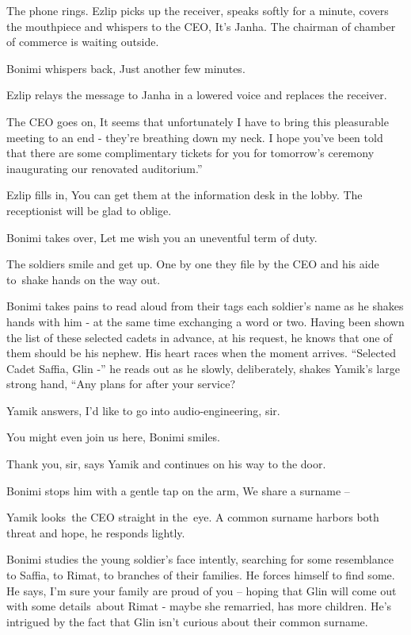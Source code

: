 \documentclass[12pt]{book}
\begin{document}
The phone rings. Ezlip picks up the receiver, speaks softly for a minute, covers the mouthpiece and whispers to the CEO,
{\textquotedbl}It's Janha. The chairman of chamber of commerce is waiting outside.{\textquotedbl}

Bonimi whispers back, {\textquotedbl}Just another few minutes.{\textquotedbl}

Ezlip relays the message to Janha in a lowered voice and replaces the receiver.

The CEO goes on, {\textquotedbl}It seems that unfortunately I have to bring this pleasurable meeting to an end - they're
breathing down my neck. I hope you've been told that there are some complimentary tickets for you for
tomorrow's{ }ceremony inaugurating our renovated auditorium.''

Ezlip fills in, {\textquotedbl}You can get them at the information desk in the lobby. The receptionist will be glad to
oblige.{\textquotedbl}

Bonimi takes over, {\textquotedbl}Let me wish you an uneventful term of duty.{\textquotedbl}

The soldiers smile and get up. One by one they file by the CEO and his aide to~shake hands on the way out.

Bonimi takes pains{ }to read aloud{
}from their tags each soldier's name as he shakes hands with him - at the same time exchanging a word or two. Having
been{ }shown the list of these selected cadets in advance, at his request, he
knows that one of them should be his nephew. His heart races when the moment arrives. ``Selected Cadet Saffia, Glin -''
he reads out as he slowly, deliberately, shakes Yamik's large strong{ }hand,
``Any plans for after your service?{\textquotedbl}

Yamik answers, {\textquotedbl}I'd like to go into audio-engineering, sir.{\textquotedbl}

{\textquotedbl}You might even join us here,{\textquotedbl} Bonimi smiles.

{\textquotedbl}Thank you, sir,{\textquotedbl} says Yamik and continues on his way to the door.

Bonimi{ }stops{ }him with a gentle tap on the arm, {\textquotedbl}We share a surname
--{\textquotedbl}

Yamik looks~the CEO straight in the~eye. {\textquotedbl}A common surname harbors both threat and hope,{\textquotedbl} he
responds lightly.

Bonimi studies the young soldier's face intently, searching for some resemblance to Saffia, to Rimat, to branches of
their families. He forces himself to find some. He says, {\textquotedbl}I'm sure your family{ }are proud
of you --{\textquotedbl} hoping that Glin will come out with some details~about Rimat - maybe she remarried, has more
children. He's intrigued by the fact that Glin isn't curious about their common surname.
\end{document}
